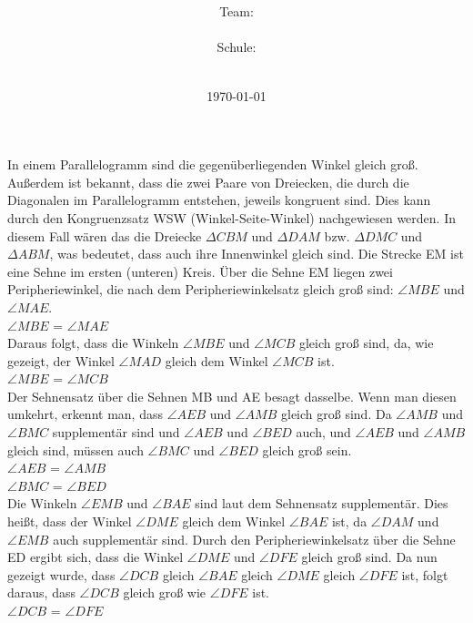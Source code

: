 \documentclass[12pt]{article}
\title{\textbf{\Huge\Aufgabe}}
\author{\large Team: \large \TeamId \\\\
	    \large Schule: \large \TeamName \\\\
	    }
\date{\large\today}
\begin{document}
\maketitle


In einem Parallelogramm sind die gegenüberliegenden Winkel gleich groß. Außerdem ist bekannt, dass die zwei Paare von Dreiecken, die durch die Diagonalen im Parallelogramm entstehen, jeweils kongruent sind. Dies kann durch den Kongruenzsatz WSW (Winkel-Seite-Winkel) nachgewiesen werden. In diesem Fall wären das die Dreiecke \(\Delta CBM\) und \(\Delta DAM\) bzw. \(\Delta DMC\) und \(\Delta ABM\), was bedeutet, dass auch ihre Innenwinkel gleich sind. Die Strecke EM ist eine Sehne im ersten (unteren) Kreis. Über die Sehne EM liegen zwei Peripheriewinkel, die nach dem Peripheriewinkelsatz gleich groß sind: \(\angle MBE\) und \(\angle MAE\). 
\\
\(\angle MBE\) = \(\angle MAE\) 
\\

Daraus folgt, dass die Winkeln \(\angle MBE\) und \(\angle MCB\) gleich groß sind, da, wie gezeigt, der Winkel \(\angle MAD\) gleich dem Winkel \(\angle MCB\) ist.
\\
\(\angle MBE\) = \(\angle MCB\)
\\

Der Sehnensatz über die Sehnen MB und AE besagt dasselbe. Wenn man diesen umkehrt, erkennt man, dass  \(\angle AEB\) und \(\angle AMB\) gleich groß sind. Da \(\angle AMB\) und \(\angle BMC\) supplementär sind und \(\angle AEB\) und \(\angle BED\) auch, und \(\angle AEB\) und \(\angle AMB\) gleich sind, müssen auch \(\angle BMC\) und \(\angle BED\) gleich groß sein. 
\\
\(\angle AEB\) = \(\angle AMB\)\\
\(\angle BMC\) = \(\angle BED\)
\\

Die Winkeln \(\angle EMB\) und \(\angle BAE\) sind laut dem Sehnensatz supplementär. Dies heißt, dass der Winkel \(\angle DME\) gleich dem Winkel \(\angle BAE\) ist, da \(\angle DAM\) und \(\angle EMB\) auch supplementär sind. Durch den Peripheriewinkelsatz über die Sehne ED ergibt sich, dass die Winkel \(\angle DME\) und \(\angle DFE\) gleich groß sind. Da nun gezeigt wurde, dass \(\angle DCB\) gleich \(\angle BAE\) gleich \(\angle DME\) gleich \(\angle DFE\) ist, folgt daraus, dass \(\angle DCB\) gleich groß wie \(\angle DFE\) ist.
\\
\(\angle DCB\) = \(\angle DFE\)
\\
\end{document}
